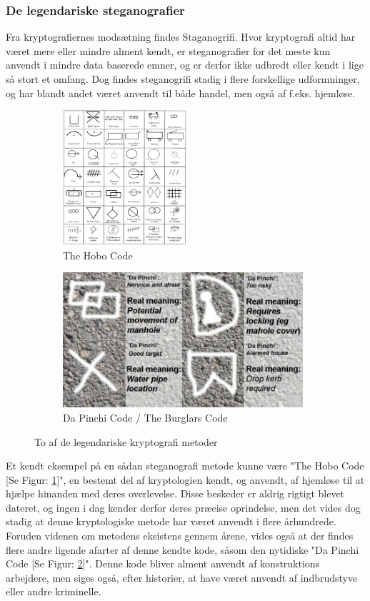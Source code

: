 \subsubsection{De legendariske steganografier}
Fra kryptografiernes modsætning findes Staganogrifi. Hvor kryptografi altid har været mere eller mindre alment kendt, er steganografier for det meste kun anvendt i mindre data baserede emner, og er derfor ikke udbredt eller kendt i lige så stort et omfang.
Dog findes steganogrifi stadig i flere forskellige udformninger, og har blandt andet været anvendt til både handel, men også af f.eks. hjemløse.
\begin{figure}[H]
    \begin{subfigure}{0.5\textwidth}
    \includegraphics[width=0.9\linewidth, height=5cm]{Projectdoc/Problemanalyse/Illustrationer/hobo-glyphs-code.jpg} 
    \caption{The Hobo Code}
    \label{fig:hobocode}
    \end{subfigure}
    \begin{subfigure}{0.5\textwidth}
    \includegraphics[width=0.9\linewidth, height=5cm]{Projectdoc/Problemanalyse/Illustrationer/BurglarsCode.jpg}
    \caption{Da Pinchi Code / The Burglars Code}
    \label{fig:burglarscode}
    \end{subfigure}
    \caption{To af de legendariske kryptografi metoder}
    \label{fig:legendscode}
\end{figure}
\noindent
Et kendt eksempel på en sådan steganografi metode kunne være "The Hobo Code [Se Figur: \ref{fig:hobocode}]", en bestemt del af kryptologien kendt, og anvendt, af hjemløse til at hjælpe hinanden med deres overlevelse\cite{TheHoboCode}. Disse beskeder er aldrig rigtigt blevet dateret, og ingen i dag kender derfor deres præcise oprindelse, men det vides dog stadig at denne kryptologiske metode har været anvendt i flere århundrede.\\ 
Foruden videnen om metodens eksistens gennem årene, vides også at der findes flere andre ligende afarter af denne kendte kode, såsom den nytidiske "Da Pinchi Code [Se Figur: \ref{fig:burglarscode}]". Denne kode bliver alment anvendt af konstruktions arbejdere, men siges også, efter historier, at have været anvendt af indbrudstyve eller andre kriminelle.\cite{DaPinchiCode}

